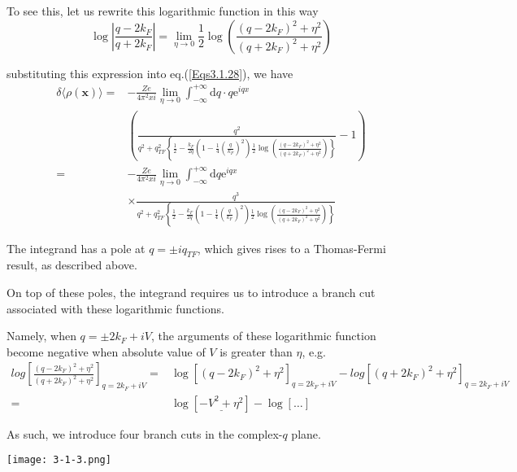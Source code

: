 \begin{itemize}
To see this, let us rewrite this logarithmic function in this way
\begin{equation}\label{Eqs3.1.30}
\log\left| \frac{q-2 k_F}{q+ 2k_F} \right| = \lim_{\eta \rightarrow 0} \frac{1}{2} \log \left( \frac{(q-2 k_F)^2 + \eta^2}{(q + 2 k_F)^2 + \eta^2}\right)
\end{equation}

substituting this expression into eq.(\ref{Eqs3.1.28}), we have
\[\begin{split}
\delta \langle \rho(\mathbf{x}) \rangle =& -\frac{Z e}{4\pi^2 x i} \lim_{\eta \rightarrow 0} \int_{-\infty}^{+\infty} \mathrm{d} q \cdot q \mathrm{e}^{i q x}\\
& \left(  \frac{q^2}{q^2 + q_{TF}^2 \left\{\frac{1}{2}-\frac{k_F}{2q}\left( 1-\frac{1}{4}(\frac{q}{k_F})^2 \right) \frac{1}{2} \log \left( \frac{(q-2 k_F)^2 + \eta^2}{(q + 2 k_F)^2 + \eta^2}\right) \right\}} -1 \right)\\
=& -\frac{Z e}{4\pi^2 x i} \lim_{\eta \rightarrow 0} \int_{-\infty}^{+\infty} \mathrm{d} q  \mathrm{e}^{i q x}\\
&\times \frac{q^3}{q^2 + q_{TF}^2 \left\{\frac{1}{2}-\frac{k_F}{2q}\left( 1-\frac{1}{4}(\frac{q}{k_F})^2 \right) \frac{1}{2} \log \left( \frac{(q-2 k_F)^2 + \eta^2}{(q + 2 k_F)^2 + \eta^2}\right) \right\}}
\end{split}\]

The integrand has a pole at $q = \pm i q_{TF}$, which gives rises to a Thomas-Fermi result, as described above.

On top of these poles, the integrand requires us to introduce a branch cut associated with these logarithmic functions.

Namely, when $q=\pm 2 k_F + i V$, the arguments of these logarithmic function become negative when absolute value of $V$ is greater than $\eta$, e.g.
\begin{equation} \label{Eqs3.1.31} \begin{split}
log \left[ \frac{(q-2 k_F)^2 + \eta^2}{(q + 2 k_F)^2 + \eta^2}\right]_{q=2 k_F + i V} =& \log \left[ (q-2 k_F)^2 + \eta^2 \right]_{q=2 k_F + i V}-log \left[ (q+2 k_F)^2 + \eta^2 \right]_{q=2 k_F + i V}\\
=& \log\left[ \underline{-V^2 + \eta^2} \right] - \log[\ldots]
\end{split}\end{equation}

As such, we introduce four branch cuts in the complex-$q$ plane.

\begin{center} \label{Fig3.1.3}
\texttt{[image: 3-1-3.png]}
\end{center}


\end{itemize}
